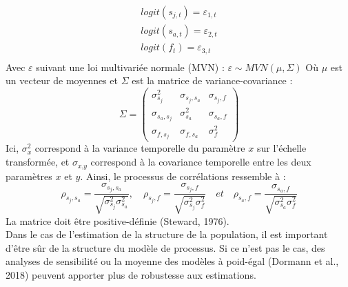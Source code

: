 \documentclass[12pt,a4paper]{article}
\begin{document}
\begin{equation}
\begin{aligned}
logit(s_{j,t}) = \varepsilon_{1,t}\\
logit(s_{a,t}) = \varepsilon_{2,t}\\
logit(f_{t}) = \varepsilon_{3,t}\\
\end{aligned}
\end{equation}
Avec $\varepsilon$ suivant une loi multivariée normale (MVN) :
$\varepsilon \sim MVN(\mu,\Sigma)$
Où $\mu$ est un vecteur de moyennes et $\Sigma$ est la matrice de variance-covariance : 
\begin{equation}
\Sigma = \begin{pmatrix}
    \sigma^2_{s_j}      & \sigma_{s_{j},s_{a}}  & \sigma_{s_{j},f}  \\ 
    \sigma_{s_{a},s_{j}}  & \sigma^2_{s_a}  & \sigma_{s_{a},f}  \\ 
    \sigma_{f,s_{j}}       & \sigma_{f,s_{a}}  & \sigma^2_{f} 
\end{pmatrix}
\end{equation}
Ici, $ \sigma^2_{\textit{x}}$  correspond à la variance temporelle du paramètre $\textit{x}$ sur l'échelle transformée, et $\sigma_{\textit{x},\textit{y}} $ correspond à la covariance temporelle entre les deux paramètres $\textit{x}$ et $\textit{y}$. Ainsi, le processus de corrélations ressemble à :
\begin{equation}
\rho_{s_{j},s_{a}}=\dfrac{\sigma_{s_{j},s_{a}}}{\sqrt{ \sigma^2_{s_j}  \sigma^2_{s_a} }},\quad \rho_{s_{j},f}=\dfrac{\sigma_{s_{j},f}}{\sqrt{ \sigma^2_{s_j}  \sigma^2_{f} }}\quad et \quad \rho_{s_{a},f}=\dfrac{\sigma_{s_{a},f}}{\sqrt{ \sigma^2_{s_a}  \sigma^2_{f} }}
\end{equation}
La matrice doit être positive-définie (Steward, 1976).\\
Dans le cas de l'estimation de la structure de la population, il est important d'être sûr de la structure du modèle de processus. Si ce n'est pas le cas, des analyses de sensibilité ou la moyenne des modèles à poid-égal (Dormann et al., 2018) peuvent apporter plus de robustesse aux estimations.
\end{document}
